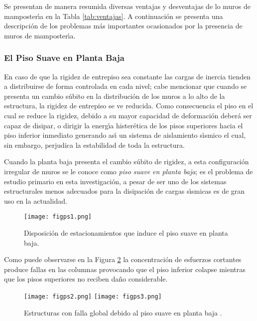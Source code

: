 Se presentan de manera resumida diversas ventajas y desventajas de lo muros de mamposter\'{\i}a en la Tabla \ref{tab:ventajas}. A continuaci\'on se presenta una descripci\'on de los problemas m\'as importantes ocasionados por la presencia de muros de mamposter\'{\i}a.

	\subsubsection{El Piso Suave en Planta Baja}
	
En caso de que la rigidez de entrepiso sea constante las cargas de inercia tienden a distribuirse de forma controlada en cada nivel; cabe mencionar que cuando se presenta un cambio s\'ubito en la distribuci\'on de los muros a lo alto de la estructura, la rigidez de entrepiso se ve reducida. Como consecuencia el piso en el cual se reduce la rigidez, debido a su mayor capacidad de deformaci\'on deber\'a ser capaz de disipar, o dirigir la energ\'{\i}a hister\'etica de los pisos superiores hacia el piso inferior inmediato generando as\'{\i} un sistema de aislamiento s\'{\i}smico el cual, sin embargo, perjudica la estabilidad de toda la estructura.

Cuando la planta baja presenta el cambio s\'ubito de rigidez, a esta configuraci\'on irregular de muros se le conoce como \emph{piso suave en planta baja}; es el problema de estudio primario en esta investigaci\'on, a pesar de ser uno de los sistemas estructurales menos adecuados para la disipaci\'on de cargas s\'{\i}smicas es de gran uso en la actualidad. 

\begin{figure}
	\centering
		\texttt{[image: figps1.png]}
	\caption{Disposici\'on de estacionamientos que induce el piso suave en planta baja.}
	\label{fig:figm3}
\end{figure}

	Como puede observarse en la Figura \ref{fig:figm4} la concentraci\'on de esfuerzos cortantes produce fallas en las columnas provocando que el piso inferior colapse mientras que los pisos superiores no reciben da\~no considerable.

\begin{figure}[htbp]
	\centering
	\texttt{[image: figps2.png]}
		\texttt{[image: figps3.png]}
	\caption{Estructuras con falla global debido al piso suave en planta baja \cite{WHE2011,WD2012}.}
	\label{fig:figm4}
\end{figure}

